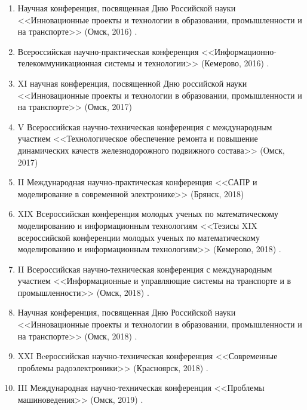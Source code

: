 \begin{enumerate}

\item Научная конференция, посвященная Дню Российской науки <<Инновационные проекты и технологии в образовании, промышленности и на транспорте>> (Омск, 2016) \cite{detectors_local2016}.	

\item  Всероссийская научно-практическая конференция <<Информационно-телекоммуникационная системы и технологии>>
(Кемерово, 2016) \cite{boundary_recognition2017}.

\item XI научная конференция, посвященной Дню российской науки <<Инновационные проекты и технологии в образовании, промышленности и на транспорте>> (Омск, 2017) \cite{innovative_projects2017}

\item V Всероссийская научно-техническая конференция с международным участием <<Технологическое обеспечение ремонта и повышение динамических качеств железнодорожного подвижного состава>> (Омск, 2017)  \cite{implementation_of_algorithms2017}

\item II Международная научно-практическая конференция  <<САПР и моделирование в современной электронике>> (Брянск, 2018)  \cite{information-measuring2018}

\item XIX Всероссийская конференция молодых ученых по математическому моделированию и информационным технологиям <<Тезисы XIX всероссийской конференции молодых ученых  по математическому моделированию и информационным технологиям>> (Кемерово, 2018)  \cite{efficiency_mark2018}.

\item II Всероссийская научно-техническая конференция с международным участием <<Информационные и управляющие системы на транспорте и в промышленности>> (Омск, 2018) \cite{accuracy_study2018}.

\item Научная конференция, посвященная Дню Российской науки <<Инновационные проекты и технологии в образовании, промышленности и на транспорте>> (Омск, 2018) \cite{depth_expansion2018}.

\item XXI Вcероссийская научно-техническая конференция <<Современные проблемы радоэлектроники>> (Красноярск, 2018) \cite{application_of_fast2018}.

\item III Международная научно-техническая конференция <<Проблемы машиноведения>> (Омск, 2019) \cite{cache_oriented2019}.


\end{enumerate}
